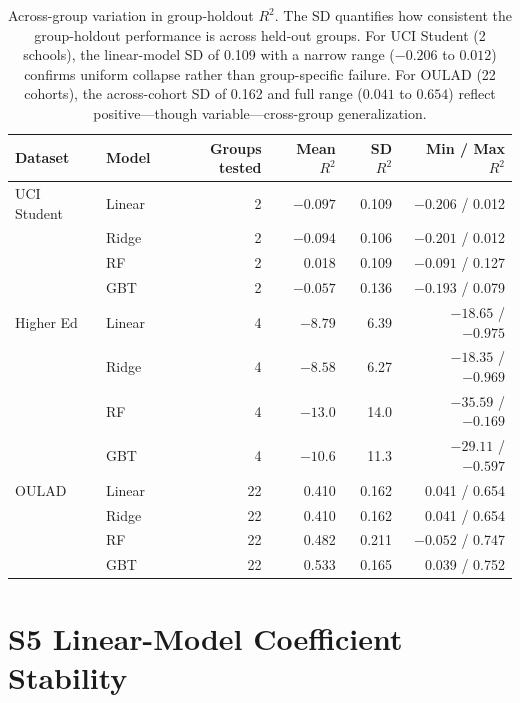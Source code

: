 \documentclass[10pt,letterpaper]{article}
\begin{document}
\begin{table}[!h]
\centering
\caption{Across-group variation in group-holdout $R^2$. The SD quantifies how consistent the group-holdout performance is across held-out groups. For UCI Student (2 schools), the linear-model SD of 0.109 with a narrow range ($-0.206$ to $0.012$) confirms uniform collapse rather than group-specific failure. For OULAD (22 cohorts), the across-cohort SD of 0.162 and full range ($0.041$ to $0.654$) reflect positive---though variable---cross-group generalization.}
\label{tab:group_holdout_uncertainty}
\small
\begin{tabular}{l l r r r r}
\toprule
Dataset & Model & Groups tested & Mean $R^2$ & SD $R^2$ & Min / Max $R^2$ \\
\midrule
UCI Student & Linear & 2 & $-0.097$ & 0.109 & $-0.206$ / 0.012 \\
 & Ridge & 2 & $-0.094$ & 0.106 & $-0.201$ / 0.012 \\
 & RF & 2 & 0.018 & 0.109 & $-0.091$ / 0.127 \\
 & GBT & 2 & $-0.057$ & 0.136 & $-0.193$ / 0.079 \\
\midrule
Higher Ed & Linear & 4 & $-8.79$ & 6.39 & $-18.65$ / $-0.975$ \\
 & Ridge & 4 & $-8.58$ & 6.27 & $-18.35$ / $-0.969$ \\
 & RF & 4 & $-13.0$ & 14.0 & $-35.59$ / $-0.169$ \\
 & GBT & 4 & $-10.6$ & 11.3 & $-29.11$ / $-0.597$ \\
\midrule
OULAD & Linear & 22 & 0.410 & 0.162 & 0.041 / 0.654 \\
 & Ridge & 22 & 0.410 & 0.162 & 0.041 / 0.654 \\
 & RF & 22 & 0.482 & 0.211 & $-0.052$ / 0.747 \\
 & GBT & 22 & 0.533 & 0.165 & 0.039 / 0.752 \\
\bottomrule
\end{tabular}
\end{table}

\clearpage
\section*{S5 Linear-Model Coefficient Stability}
\end{document}
